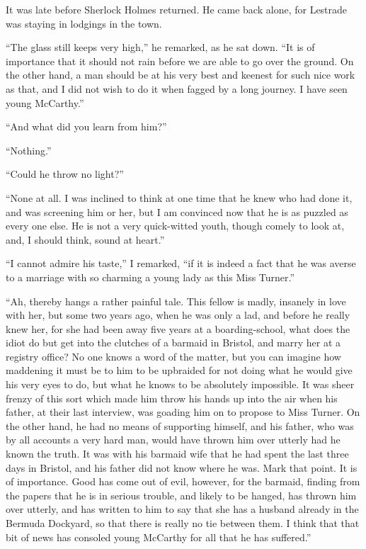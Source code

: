 It was late before Sherlock Holmes returned. He came
back alone, for Lestrade was staying in lodgings in the town.

“The glass still keeps very high,” he remarked, as he sat
down. “It is of importance that it should not rain before we
are able to go over the ground. On the other hand, a man
should be at his very best and keenest for such nice work as
that, and I did not wish to do it when fagged by a long
journey. I have seen young McCarthy.”

“And what did you learn from him?”

“Nothing.”

“Could he throw no light?”

“None at all. I was inclined to think at one time that he
knew who had done it, and was screening him or her, but I
am convinced now that he is as puzzled as every one else. He
is not a very quick-witted youth, though comely to look at,
and, I should think, sound at heart.”

“I cannot admire his taste,” I remarked, “if it is indeed a
fact that he was averse to a marriage with so charming a
young lady as this Miss Turner.”

“Ah, thereby hangs a rather painful tale. This fellow is
madly, insanely in love with her, but some two years ago,
when he was only a lad, and before he really knew her, for
she had been away five years at a boarding-school, what does
the idiot do but get into the clutches of a barmaid in Bristol,
and marry her at a registry office? No one knows a word of
the matter, but you can imagine how maddening it must be to
him to be upbraided for not doing what he would give his
very eyes to do, but what he knows to be absolutely impossible.
It was sheer frenzy of this sort which made him throw
his hands up into the air when his father, at their last interview,
was goading him on to propose to Miss Turner. On the
other hand, he had no means of supporting himself, and his
father, who was by all accounts a very hard man, would have
thrown him over utterly had he known the truth. It was with
his barmaid wife that he had spent the last three days in
Bristol, and his father did not know where he was. Mark
that point. It is of importance. Good has come out of evil,
however, for the barmaid, finding from the papers that he is
in serious trouble, and likely to be hanged, has thrown him
over utterly, and has written to him to say that she has a
husband already in the Bermuda Dockyard, so that there is
really no tie between them. I think that that bit of news has
consoled young McCarthy for all that he has suffered.”

